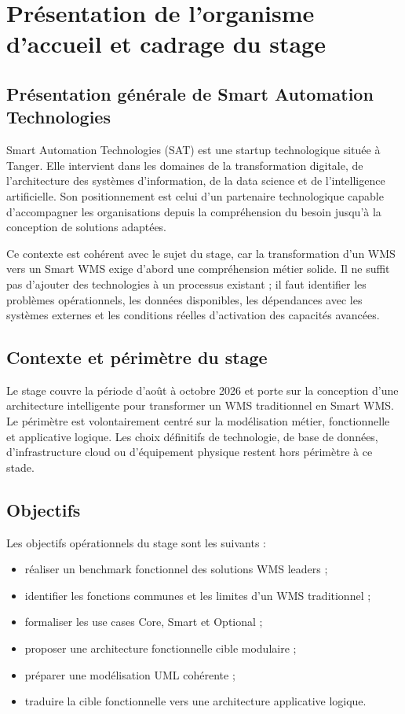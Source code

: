 \chapter{Présentation de l'organisme d'accueil et cadrage du stage}
\section{Présentation générale de Smart Automation Technologies}
Smart Automation Technologies (SAT) est une startup technologique située à Tanger. Elle intervient dans les domaines de la transformation digitale, de l'architecture des systèmes d'information, de la data science et de l'intelligence artificielle. Son positionnement est celui d'un partenaire technologique capable d'accompagner les organisations depuis la compréhension du besoin jusqu'à la conception de solutions adaptées.

Ce contexte est cohérent avec le sujet du stage, car la transformation d'un WMS vers un Smart WMS exige d'abord une compréhension métier solide. Il ne suffit pas d'ajouter des technologies à un processus existant ; il faut identifier les problèmes opérationnels, les données disponibles, les dépendances avec les systèmes externes et les conditions réelles d'activation des capacités avancées.

\section{Contexte et périmètre du stage}
Le stage couvre la période d'août à octobre 2026 et porte sur la conception d'une architecture intelligente pour transformer un WMS traditionnel en Smart WMS. Le périmètre est volontairement centré sur la modélisation métier, fonctionnelle et applicative logique. Les choix définitifs de technologie, de base de données, d'infrastructure cloud ou d'équipement physique restent hors périmètre à ce stade.

\section{Objectifs}
Les objectifs opérationnels du stage sont les suivants :
\begin{itemize}[leftmargin=1.2cm]
  \item réaliser un benchmark fonctionnel des solutions WMS leaders ;
  \item identifier les fonctions communes et les limites d'un WMS traditionnel ;
  \item formaliser les use cases Core, Smart et Optional ;
  \item proposer une architecture fonctionnelle cible modulaire ;
  \item préparer une modélisation UML cohérente ;
  \item traduire la cible fonctionnelle vers une architecture applicative logique.
\end{itemize}

